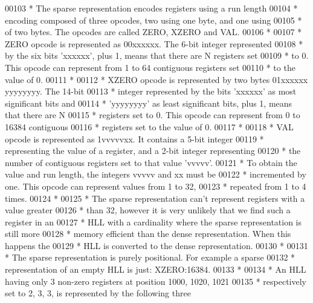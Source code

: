 \begin{DoxyCode}
00103 \textcolor{comment}{ * The sparse representation encodes registers using a run length}
00104 \textcolor{comment}{ * encoding composed of three opcodes, two using one byte, and one using}
00105 \textcolor{comment}{ * of two bytes. The opcodes are called ZERO, XZERO and VAL.}
00106 \textcolor{comment}{ *}
00107 \textcolor{comment}{ * ZERO opcode is represented as 00xxxxxx. The 6-bit integer represented}
00108 \textcolor{comment}{ * by the six bits 'xxxxxx', plus 1, means that there are N registers set}
00109 \textcolor{comment}{ * to 0. This opcode can represent from 1 to 64 contiguous registers set}
00110 \textcolor{comment}{ * to the value of 0.}
00111 \textcolor{comment}{ *}
00112 \textcolor{comment}{ * XZERO opcode is represented by two bytes 01xxxxxx yyyyyyyy. The 14-bit}
00113 \textcolor{comment}{ * integer represented by the bits 'xxxxxx' as most significant bits and}
00114 \textcolor{comment}{ * 'yyyyyyyy' as least significant bits, plus 1, means that there are N}
00115 \textcolor{comment}{ * registers set to 0. This opcode can represent from 0 to 16384 contiguous}
00116 \textcolor{comment}{ * registers set to the value of 0.}
00117 \textcolor{comment}{ *}
00118 \textcolor{comment}{ * VAL opcode is represented as 1vvvvvxx. It contains a 5-bit integer}
00119 \textcolor{comment}{ * representing the value of a register, and a 2-bit integer representing}
00120 \textcolor{comment}{ * the number of contiguous registers set to that value 'vvvvv'.}
00121 \textcolor{comment}{ * To obtain the value and run length, the integers vvvvv and xx must be}
00122 \textcolor{comment}{ * incremented by one. This opcode can represent values from 1 to 32,}
00123 \textcolor{comment}{ * repeated from 1 to 4 times.}
00124 \textcolor{comment}{ *}
00125 \textcolor{comment}{ * The sparse representation can't represent registers with a value greater}
00126 \textcolor{comment}{ * than 32, however it is very unlikely that we find such a register in an}
00127 \textcolor{comment}{ * HLL with a cardinality where the sparse representation is still more}
00128 \textcolor{comment}{ * memory efficient than the dense representation. When this happens the}
00129 \textcolor{comment}{ * HLL is converted to the dense representation.}
00130 \textcolor{comment}{ *}
00131 \textcolor{comment}{ * The sparse representation is purely positional. For example a sparse}
00132 \textcolor{comment}{ * representation of an empty HLL is just: XZERO:16384.}
00133 \textcolor{comment}{ *}
00134 \textcolor{comment}{ * An HLL having only 3 non-zero registers at position 1000, 1020, 1021}
00135 \textcolor{comment}{ * respectively set to 2, 3, 3, is represented by the following three}

\end{DoxyCode}
